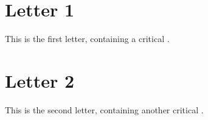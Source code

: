 \documentclass{scrbook}
\begin{document}
\chapter{Letter 1}

\beginnumbering
\pstart This is the first letter, containing a critical .
\pend
\endnumbering

\chapter{Letter 2}

\beginnumbering
\pstart This is the second letter, containing another critical .
\pend
\endnumbering

\newpage
{}
\end{document}
